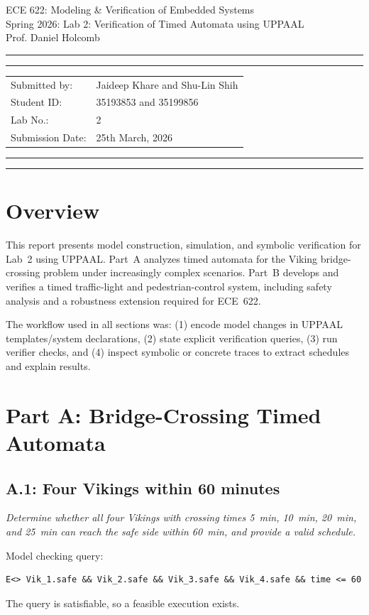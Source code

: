 \documentclass[10pt]{article}
\newcommand{\studentname}{Jaideep Khare and Shu-Lin Shih}
\newcommand{\studentnumber}{35193853 and 35199856}
\newcommand{\coursename}{ECE 622: Modeling \& Verification of Embedded Systems}
\newcommand{\semester}{Spring 2026}
\newcommand{\afterprompt}{\par\medskip}
\begin{document}
\begin{center}
{\huge{\coursename}} \\
\vspace{2mm}
{\Large{\semester: Lab 2: Verification of Timed Automata using UPPAAL}}\\
\vspace{1mm}
{\Large{Prof. Daniel Holcomb}}
\end{center}

\vspace{5mm}
\hrule
\vspace{1mm}
\hrule

\vspace{3mm}
\begin{tabular}{ll}
Submitted by:  & {\studentname} \\
Student ID:     & {\studentnumber} \\
Lab No.:        & 2 \\
Submission Date:& 25th March, 2026 \\
\end{tabular}

\vspace{3mm}
\hrule
\vspace{1mm}
\hrule

\section*{Overview}
This report presents model construction, simulation, and symbolic verification for Lab~2 using UPPAAL. Part~A analyzes timed automata for the Viking bridge-crossing problem under increasingly complex scenarios. Part~B develops and verifies a timed traffic-light and pedestrian-control system, including safety analysis and a robustness extension required for ECE~622.

The workflow used in all sections was: (1) encode model changes in UPPAAL templates/system declarations, (2) state explicit verification queries, (3) run verifier checks, and (4) inspect symbolic or concrete traces to extract schedules and explain results.

\section{Part A: Bridge-Crossing Timed Automata}

\subsection*{A.1: Four Vikings within 60 minutes}
\textit{Determine whether all four Vikings with crossing times \SI{5}{min}, \SI{10}{min}, \SI{20}{min}, and \SI{25}{min} can reach the safe side within \SI{60}{min}, and provide a valid schedule.}
\afterprompt
Model checking query:
\begin{lstlisting}[style=uppaal]
E<> Vik_1.safe && Vik_2.safe && Vik_3.safe && Vik_4.safe && time <= 60
\end{lstlisting}
The query is satisfiable, so a feasible execution exists.
\end{document}
